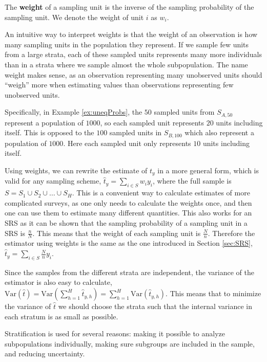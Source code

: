 \documentclass{article}
\begin{document}
\begin{definition}
 The \textbf{weight} of a sampling unit is the inverse of the sampling
 probability of the sampling unit. 
 We denote the weight of unit \(i\) as \(w_i\).
\end{definition}

An intuitive way to interpret weights is that the weight of an observation is
how many sampling units in the population they represent. If we sample few units
from a large strata, each of these sampled units represents many more individuals than
in a strata where we sample almost the whole subpopulation. The name weight
makes sense, as an observation representing many unobserved units should
``weigh'' more when estimating values than observations representing few
unobserved units.

Specifically, in Example \ref{ex:uneqProbs}, the \(50\) sampled units from \(S_{A,
  50}\) represent a population of \(1000\), so each sampled unit represents
\(20\) units including itself. This is opposed to the \(100\) sampled units in
\(S_{B, 100}\) which also represent a population of \(1000\). Here each sampled
unit only represents \(10\) units including itself.


Using weights, we can rewrite the estimate of \(t_y\) in a more general form,
which is valid for any sampling scheme, \(\hat{t}_y = \sum_{i \in S}w_i y_i\),
where the full sample is \(S = S_1 \cup S_2 \cup \dots \cup S_H\).
This is a convenient way to calculate estimates of more complicated surveys, as
one only needs to calculate the weights once, and then one can use them to
estimate many different quantities.
This also works for an SRS as it can be shown that the sampling probability of a sampling unit in a SRS is
\(\frac{n}{N}\). This means that the weight of each sampling unit is
\(\frac{N}{n}\). Therefore the estimator using weights is the same as the one
introduced in Section \ref{sec:SRS}, \(\hat{t}_y = \sum_{i \in S}\frac{N}{n} y_i\).

Since the samples from the different strata are independent, the variance of the estimator is also
easy to calculate, \(\mathrm{Var}(\hat{t}) = \mathrm{Var}\left(\sum_{h =
   1}^H\hat{t}_{y, h}\right) = \sum_{h =
   1}^H\mathrm{Var}\left(\hat{t}_{y, h}\right)\). This
means that to minimize the variance of \(\hat{t}\) we should choose the strata
such that the internal variance in each stratum is as small as possible.

Stratification is used for several reasons: making it possible to analyze
subpopulations individually, making sure subgroups are included in the sample,
and reducing uncertainty.
\end{document}
